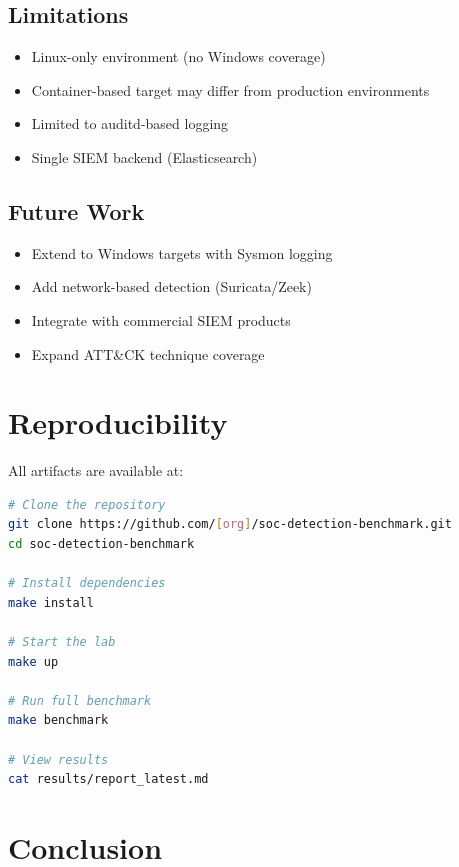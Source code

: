 \documentclass[11pt,a4paper]{article}
\begin{document}
\subsection{Limitations}

\begin{itemize}
    \item Linux-only environment (no Windows coverage)
    \item Container-based target may differ from production environments
    \item Limited to auditd-based logging
    \item Single SIEM backend (Elasticsearch)
\end{itemize}

\subsection{Future Work}

\begin{itemize}
    \item Extend to Windows targets with Sysmon logging
    \item Add network-based detection (Suricata/Zeek)
    \item Integrate with commercial SIEM products
    \item Expand ATT\&CK technique coverage
\end{itemize}

\section{Reproducibility}

All artifacts are available at:

\begin{lstlisting}[language=bash]
# Clone the repository
git clone https://github.com/[org]/soc-detection-benchmark.git
cd soc-detection-benchmark

# Install dependencies
make install

# Start the lab
make up

# Run full benchmark
make benchmark

# View results
cat results/report_latest.md
\end{lstlisting}

\section{Conclusion}
\end{document}
